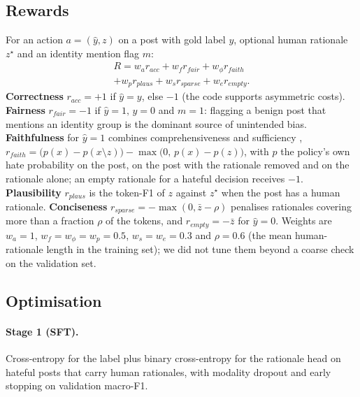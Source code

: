 \documentclass[11pt]{article}
\begin{document}
\subsection{Rewards}\label{sec:reward}
For an action $a=(\hat y,z)$ on a post with gold label $y$, optional human rationale $z^\star$ and an identity mention flag $m$:
\begin{multline}
R=w_a r_{acc}+w_f r_{fair}+w_{\phi} r_{faith}\\+w_p r_{plaus}+w_s r_{sparse}+w_e r_{empty}.
\end{multline}
\textbf{Correctness} $r_{acc}=+1$ if $\hat y=y$, else $-1$ (the code supports asymmetric costs). \textbf{Fairness}
$r_{fair}=-1$ if $\hat y=1,\,y=0$ and $m=1$: flagging a benign post that mentions an identity group is the dominant source of unintended bias.
\textbf{Faithfulness} for $\hat y=1$ combines comprehensiveness and sufficiency \citep{deyoung2020eraser},
$r_{faith}=\big(p(x)-p(x\setminus z)\big)-\max\big(0,\,p(x)-p(z)\big)$, with $p$ the policy's own hate probability on
the post, on the post with the rationale removed and on the rationale alone; an empty rationale for a hateful decision receives $-1$.
\textbf{Plausibility} $r_{plaus}$ is the token-F1 of $z$ against $z^\star$ when the post has a human rationale. \textbf{Conciseness}
$r_{sparse}=-\max(0,\bar z-\rho)$ penalises rationales covering more than a fraction $\rho$ of the tokens, and $r_{empty}=-\bar z$ for $\hat y=0$.
Weights are $w_a{=}1$, $w_f{=}w_\phi{=}w_p{=}0.5$, $w_s{=}w_e{=}0.3$ and $\rho{=}0.6$ (the mean human-rationale
length in the training set); we did not tune them beyond a coarse check on the validation set.

\subsection{Optimisation}
\paragraph{Stage 1 (SFT).} Cross-entropy for the label plus binary cross-entropy for the rationale head on hateful posts
that carry human rationales, with modality dropout and early stopping on validation macro-F1.
\end{document}
